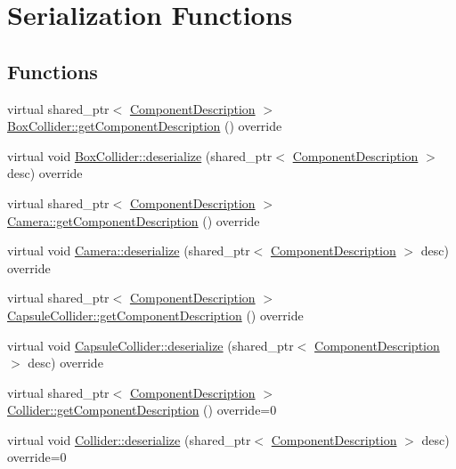 \hypertarget{group__serialization__functions}{}\section{Serialization Functions}
\label{group__serialization__functions}
\subsection*{Functions}
\begin{DoxyCompactItemize}
\item 
virtual shared\+\_\+ptr$<$ \hyperlink{class_component_description}{Component\+Description} $>$ \hyperlink{group__serialization__functions_gad0cea24e9390a50ce68178944128cfab}{Box\+Collider\+::get\+Component\+Description} () override
\item 
virtual void \hyperlink{group__serialization__functions_ga495b07647b7b0c2a843be54180dab9e4}{Box\+Collider\+::deserialize} (shared\+\_\+ptr$<$ \hyperlink{class_component_description}{Component\+Description} $>$ desc) override
\item 
virtual shared\+\_\+ptr$<$ \hyperlink{class_component_description}{Component\+Description} $>$ \hyperlink{group__serialization__functions_gaf6a6ed08cfe3a456a1c38650c30a7231}{Camera\+::get\+Component\+Description} () override
\item 
virtual void \hyperlink{group__serialization__functions_gad2a03326aa3e8101471160c36058bd6c}{Camera\+::deserialize} (shared\+\_\+ptr$<$ \hyperlink{class_component_description}{Component\+Description} $>$ desc) override
\item 
virtual shared\+\_\+ptr$<$ \hyperlink{class_component_description}{Component\+Description} $>$ \hyperlink{group__serialization__functions_ga9dc5198cfc2de557ac56210cce1dce82}{Capsule\+Collider\+::get\+Component\+Description} () override
\item 
virtual void \hyperlink{group__serialization__functions_ga6bd7fb4ea4628b29528aaf28d78ff325}{Capsule\+Collider\+::deserialize} (shared\+\_\+ptr$<$ \hyperlink{class_component_description}{Component\+Description} $>$ desc) override
\item 
virtual shared\+\_\+ptr$<$ \hyperlink{class_component_description}{Component\+Description} $>$ \hyperlink{group__serialization__functions_ga9bee953be54c842bd37244d1f3126745}{Collider\+::get\+Component\+Description} () override=0
\item 
virtual void \hyperlink{group__serialization__functions_gaa82ff0f6d5986bf4128bc50ec9932a04}{Collider\+::deserialize} (shared\+\_\+ptr$<$ \hyperlink{class_component_description}{Component\+Description} $>$ desc) override=0

\end{DoxyCompactItemize}
